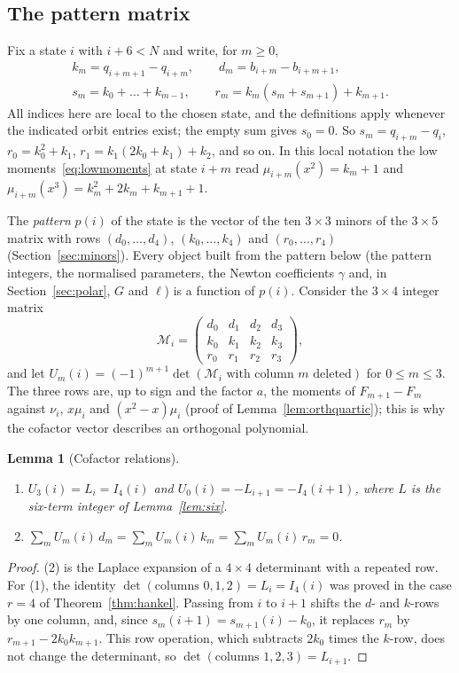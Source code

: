 \documentclass[11pt]{article}
\newtheorem{lemma}[theorem]{Lemma}
\theoremstyle{definition}
\theoremstyle{remark}
\begin{document}
\subsection{The pattern matrix}\label{sec:patternmatrix}
Fix a state $i$ with $i+6<N$ and write, for $m\ge0$,
\begin{gather*}
k_m=q_{i+m+1}-q_{i+m},\qquad d_m=b_{i+m}-b_{i+m+1},\\
s_m=k_0+\dots+k_{m-1},\qquad r_m=k_m(s_m+s_{m+1})+k_{m+1}.
\end{gather*}
All indices here are local to the chosen state, and the definitions apply
whenever the indicated orbit entries exist; the empty sum gives $s_0=0$.
So $s_m=q_{i+m}-q_i$, $r_0=k_0^2+k_1$, $r_1=k_1(2k_0+k_1)+k_2$, and so on.
In this local notation the low moments~\eqref{eq:lowmoments} at state $i+m$ read
$\mu_{i+m}(x^2)=k_m+1$ and $\mu_{i+m}(x^3)=k_m^2+2k_m+k_{m+1}+1$.

The \emph{pattern} $p(i)$ of the state is the vector of the ten $3\times3$
minors of the $3\times5$ matrix with rows $(d_0,\dots,d_4)$, $(k_0,\dots,k_4)$
and $(r_0,\dots,r_4)$ (Section~\ref{sec:minors}). Every object built from the
pattern below (the pattern integers, the normalised parameters, the Newton
coefficients $\gamma$ and, in Section~\ref{sec:polar}, $G$ and $\ell$) is a
function of $p(i)$. Consider the
$3\times4$ integer matrix
\[
\mathcal M_i=\begin{pmatrix} d_0&d_1&d_2&d_3\\ k_0&k_1&k_2&k_3\\ r_0&r_1&r_2&r_3\end{pmatrix},
\]
and let $U_m(i)=(-1)^{m+1}\det(\mathcal M_i\text{ with column $m$ deleted})$ for
$0\le m\le3$. The three rows are, up to sign and the factor $a$, the moments of
$F_{m+1}-F_m$ against $\nu_i$, $x\mu_i$ and $(x^2-x)\mu_i$ (proof of
Lemma~\ref{lem:orthquartic}); this is why the cofactor vector describes an
orthogonal polynomial.

\begin{lemma}[Cofactor relations]\label{lem:pattern}
\begin{enumerate}
\item $U_3(i)=L_i=I_4(i)$ and $U_0(i)=-L_{i+1}=-I_4(i+1)$, where $L$ is the six-term integer of
Lemma~\ref{lem:six}.
\item $\sum_m U_m(i)\,d_m=\sum_m U_m(i)\,k_m=\sum_m U_m(i)\,r_m=0$.
\end{enumerate}
\end{lemma}

\begin{proof}
(2) is the Laplace expansion of a $4\times4$ determinant with a repeated row. For (1), the
identity $\det(\text{columns }0,1,2)=L_i=I_4(i)$ was proved in the case $r=4$ of
Theorem~\ref{thm:hankel}. Passing from $i$ to $i+1$ shifts the $d$- and $k$-rows by one
column, and, since $s_m(i+1)=s_{m+1}(i)-k_0$, it replaces $r_m$ by $r_{m+1}-2k_0k_{m+1}$. This
row operation, which subtracts $2k_0$ times the $k$-row, does not change the determinant, so
$\det(\text{columns }1,2,3)=L_{i+1}$.
\end{proof}
\end{document}

